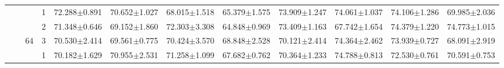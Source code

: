 \begin{table}[htpb]
{\begin{tabular}{c|c|c|c|rr|rr|rr|rr}
                                 &                                                                                 &                                                                                        & 1                                                                                         & 72.288$\pm$0.891                        & 70.652$\pm$1.027                        & 68.015$\pm$1.518                        & 65.379$\pm$1.575                        & 73.909$\pm$1.247                        & 74.061$\pm$1.037                        & 74.106$\pm$1.286                        & 69.985$\pm$2.036                       \\
                                 &                                                                                 &                                                                                        & 2                                                                                         & 71.348$\pm$0.646                        & 69.152$\pm$1.860                        & 72.303$\pm$3.308                        & 64.848$\pm$0.969                        & 73.409$\pm$1.163                        & 67.742$\pm$1.654                        & 74.379$\pm$1.220                        & 74.773$\pm$1.015                       \\
                                 &                                                                                 & \multirow{-3}{*}{64}                                                                   & 3                                                                                         & 70.530$\pm$2.414                        & 69.561$\pm$0.775                        & 70.424$\pm$3.570                        & 68.848$\pm$2.528                        & 70.121$\pm$2.414                        & 74.364$\pm$2.462                        & 73.939$\pm$0.727                        & 68.091$\pm$2.919                       \\ \cline{3-12} 
                                 &                                                                                 &                                                                                        & 1                                                                                         & 70.182$\pm$1.629                        & 70.955$\pm$2.531                        & 71.258$\pm$1.099                        & 67.682$\pm$0.762                        & 70.364$\pm$1.233                        & 74.788$\pm$0.813                        & 72.530$\pm$0.761                        & 70.591$\pm$0.753                       \\

\end{tabular}}
\end{table}

